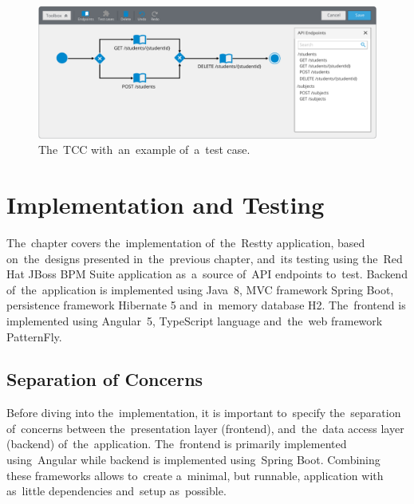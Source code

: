 \begin{figure}[!hbt]
	\centering
	\includegraphics[scale=0.65]{./designs/test-case.pdf}
	\caption{The~TCC with~an~example of~a~test case.}
	\label{fig-test-case}
\end{figure}






\chapter{Implementation and Testing}
The~chapter covers the~implementation of~the~Restty application, based on~the~designs presented
in~the~previous chapter, and~its testing using the~Red Hat JBoss BPM Suite application as~a~source
of~API endpoints to~test. Backend of~the~application is implemented using Java~8, MVC framework
Spring Boot, persistence framework Hibernate 5 and~in~memory database H2. The~frontend is implemented using
Angular~5, TypeScript language and~the~web framework PatternFly.

\section{Separation of Concerns}
Before diving into the~implementation, it is important to~specify the~separation of~concerns between
the~presentation layer (frontend), and~the~data access layer (backend) of~the~application. 
The~frontend is primarily implemented using~Angular while backend is implemented using~Spring Boot. Combining
these frameworks allows to~create a~minimal, but runnable, application with as~little dependencies and~setup as~possible.

